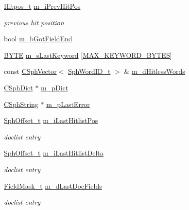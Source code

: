 \begin{DoxyCompactItemize}
\hyperlink{sphinx_8h_af1385e83d53e0648b15eae6d8f101847}{Hitpos\-\_\-t} \hyperlink{classCSphHitBuilder_af58f603397e11110becbdd058312572d}{m\-\_\-i\-Prev\-Hit\-Pos}
\begin{DoxyCompactList}\small\item\em previous hit position \end{DoxyCompactList}\item 
bool \hyperlink{classCSphHitBuilder_aa37b6ff55e60577dfdb03c854507feb6}{m\-\_\-b\-Got\-Field\-End}
\item 
\hyperlink{sphinxstd_8h_a4ae1dab0fb4b072a66584546209e7d58}{B\-Y\-T\-E} \hyperlink{classCSphHitBuilder_a8d5b93432c3e9be9a2612701545aa359}{m\-\_\-s\-Last\-Keyword} \mbox{[}\hyperlink{sphinx_8cpp_aeb328d19a9780d5c5defcd7e9b08239b}{M\-A\-X\-\_\-\-K\-E\-Y\-W\-O\-R\-D\-\_\-\-B\-Y\-T\-E\-S}\mbox{]}
\item 
const \hyperlink{classCSphVector}{C\-Sph\-Vector}$<$ \hyperlink{sphinx_8h_a80a94d5984fdf9214a98f3e5e65df963}{Sph\-Word\-I\-D\-\_\-t} $>$ \& \hyperlink{classCSphHitBuilder_a9c9b7ebb189e11c6b60722e635bdff2f}{m\-\_\-d\-Hitless\-Words}
\item 
\hyperlink{classCSphDict}{C\-Sph\-Dict} $\ast$ \hyperlink{classCSphHitBuilder_a791f30ee7760e0ea02d3bcfd7b23d1a3}{m\-\_\-p\-Dict}
\item 
\hyperlink{structCSphString}{C\-Sph\-String} $\ast$ \hyperlink{classCSphHitBuilder_af780d68ea6f2b2ca9beba35b93c75a57}{m\-\_\-p\-Last\-Error}
\item 
\hyperlink{sphinx_8h_a0fb3b64afebef33c61367714754eaa90}{Sph\-Offset\-\_\-t} \hyperlink{classCSphHitBuilder_a528c089e34d95b22beb58b200a22af2b}{m\-\_\-i\-Last\-Hitlist\-Pos}
\begin{DoxyCompactList}\small\item\em doclist entry \end{DoxyCompactList}\item 
\hyperlink{sphinx_8h_a0fb3b64afebef33c61367714754eaa90}{Sph\-Offset\-\_\-t} \hyperlink{classCSphHitBuilder_acc6f2ea21c55a9d3ce81ff3cb0534f64}{m\-\_\-i\-Last\-Hitlist\-Delta}
\begin{DoxyCompactList}\small\item\em doclist entry \end{DoxyCompactList}\item 
\hyperlink{structFieldMask__t}{Field\-Mask\-\_\-t} \hyperlink{classCSphHitBuilder_a30d059157f256bfd160a6aa7d4b2531a}{m\-\_\-d\-Last\-Doc\-Fields}
\begin{DoxyCompactList}\small\item\em doclist entry \end{DoxyCompactList}\item 

\end{DoxyCompactItemize}
